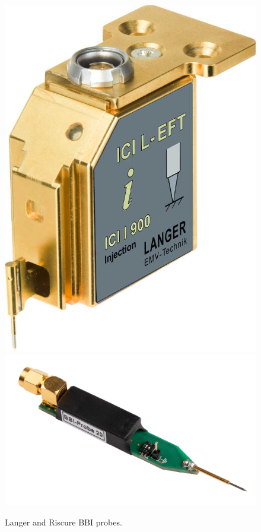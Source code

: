 
\begin{figure}
	\centering
	\includegraphics[width=0.2\columnwidth]{./figures/langerBBI.jpg}
	\hspace{0.1\columnwidth}
	\includegraphics[width=0.425\columnwidth]{./figures/em-fi-bbi-probe-20-black.jpg}
	\caption{Langer and Riscure BBI probes.}
	\label{riscure_langer}
\end{figure}